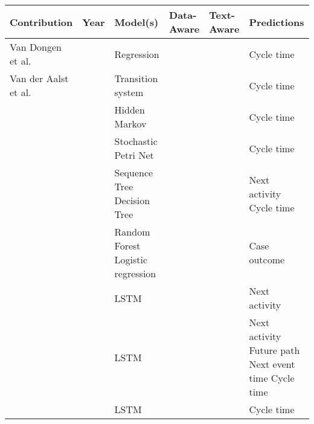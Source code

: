 \begin{table}[]
	\renewcommand{\arraystretch}{1.5}
	\begin{tabularx}{\textwidth}{p{3.5cm} l p{3.2cm} p{1.1cm} p{1.1cm} p{3cm}}
		
		\toprule
		\textbf{Contribution} & \textbf{Year} & \textbf{Model(s)}  & \textbf{Data-Aware} &  \textbf{Text-Aware} & \textbf{Predictions} \\ \midrule
		 Van Dongen et al. \cite{DBLP:conf/otm/DongenCA08}& \citeyear{DBLP:conf/otm/DongenCA08} & Regression  & \checkmark & \xmark& Cycle time\\
		 
		 Van der Aalst et al. \cite{DBLP:journals/is/AalstSS11}&  \citeyear{DBLP:journals/is/AalstSS11}& Transition system  
		   & \xmark & \xmark & Cycle time \\   
		   
		 \citeauthor{DBLP:conf/colcom/PandeyNC11} \cite{DBLP:conf/colcom/PandeyNC11} & \citeyear{DBLP:conf/colcom/PandeyNC11} & Hidden Markov & \xmark & \xmark & Cycle time \\
		 
		 \citeauthor{DBLP:conf/icsoc/Rogge-SoltiW13} \cite{DBLP:conf/icsoc/Rogge-SoltiW13} & \citeyear{DBLP:conf/icsoc/Rogge-SoltiW13} &Stochastic Petri Net & \xmark & \xmark & Cycle time\\
		 
		 \citeauthor{DBLP:conf/dis/CeciLFCM14} \cite{DBLP:conf/dis/CeciLFCM14} & \citeyear{DBLP:conf/dis/CeciLFCM14} & Sequence Tree \newline Decision Tree& \checkmark & \xmark & Next activity \newline Cycle time \\
		 
		 \citeauthor{DBLP:conf/bpm/TeinemaaDMF16}  \cite{DBLP:conf/bpm/TeinemaaDMF16} &  \citeyear{DBLP:conf/bpm/TeinemaaDMF16} & Random Forest \newline Logistic regression & \checkmark & \checkmark & Case outcome \\
		 
		 \citeauthor{ DBLP:conf/bpm/EvermannRF16} \cite{ DBLP:conf/bpm/EvermannRF16} &  \citeyear{ DBLP:conf/bpm/EvermannRF16}& LSTM & \xmark & \xmark & Next activity \\
		 
		 \citeauthor{DBLP:conf/caise/TaxVRD17} \cite{DBLP:conf/caise/TaxVRD17} & \citeyear{DBLP:conf/caise/TaxVRD17} & LSTM & \xmark & \xmark & Next activity \newline Future path \newline Next event time \newline Cycle time\\
		 \citeauthor{DBLP:conf/ssci/NavarinVPS17} \cite{DBLP:conf/ssci/NavarinVPS17} &  \citeyear{DBLP:conf/ssci/NavarinVPS17}&  LSTM & \checkmark  & \xmark & Cycle time\\
		 

\end{tabularx}
\end{table}
